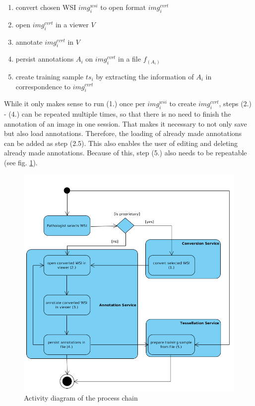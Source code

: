 \begin{enumerate}[(1.)]
	\item convert chosen WSI $img^{wsi}_i$ to open format $img^{cvrt}_i$
	\item open $img^{cvrt}_i$ in a viewer $V$
	\item annotate $img^{cvrt}_i$ in $V$
	\item persist annotations $A_i$ on $img^{cvrt}_i$ in a file $f_{(A_i)}$
	\item create training sample $ts_i$ by extracting the information of $A_i$ in correspondence to $img^{cvrt}_i$
\end{enumerate}

While it only makes sense to run (1.) once per $img^{wsi}_i$ to create $img^{cvrt}_i$, steps (2.) - (4.) can be repeated multiple times, so that there is no need to finish the annotation of an image in one session. That makes it necessary to not only save but also load annotations. Therefore, the loading of already made annotations can be added as step (2.5). This also enables the user of editing and deleting already made annotations. Because of this, step (5.) also needs to be repeatable (see fig. \ref{fig2_processChainUML}).

\begin{figure}[h]
	\begin{center}
		\includegraphics[scale=0.4]{img/processChainUML.png}
		\caption{Activity diagram of the process chain}
		\label{fig2_processChainUML}
	\end{center}
\end{figure}

